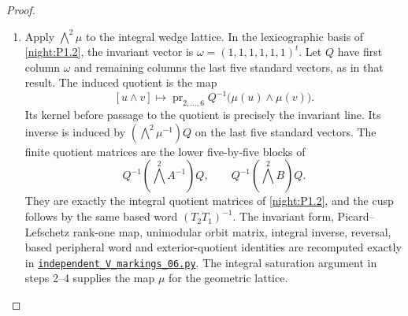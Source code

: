 \begin{proof}
\begin{enumerate}[label={$\langle1\rangle$\arabic*.}]
\item Apply $\bigwedge^2\mu$ to the integral wedge lattice. In the
lexicographic basis of \cref{night:P1.2}, the invariant vector is
$\omega=(1,1,1,1,1,1)^t$. Let $Q$ have first column $\omega$ and
remaining columns the last five standard vectors, as in that result.
The induced quotient is the map
\[
 [u\wedge v]\longmapsto
 \operatorname{pr}_{2,\ldots,6}
 Q^{-1}\bigl(\mu(u)\wedge\mu(v)\bigr).
\]
Its kernel before passage to the quotient is precisely the invariant
line. Its inverse is induced by $(\bigwedge^2\mu^{-1})Q$ on the last
five standard vectors. The finite quotient matrices are the lower
five-by-five blocks of
\[
 Q^{-1}(\bigwedge^2 A^{-1})Q,\qquad
 Q^{-1}(\bigwedge^2 B)Q.
\]
They are exactly the integral quotient matrices of
\cref{night:P1.2}, and the cusp follows by the same based word
$(T_2T_1)^{-1}$. The invariant form, Picard--Lefschetz rank-one map,
unimodular orbit matrix, integral inverse, reversal, based peripheral
word and exterior-quotient identities are recomputed exactly in
\href{https://github.com/KokunoYumeto/s6-complex-structure-workbench/blob/83d76022bcd442278b760db9ff438afceed6c6ea/pro_returns/S6_SERIES_GRIND_checkpoint_10_20261120T0211Z/code/current_audits/audit_corrections/code/independent_V_markings_06.py}{\texttt{independent\_V\_markings\_06.py}}.
The integral saturation argument in steps 2--4 supplies the map $\mu$
for the geometric lattice.
\end{enumerate}
\end{proof}




